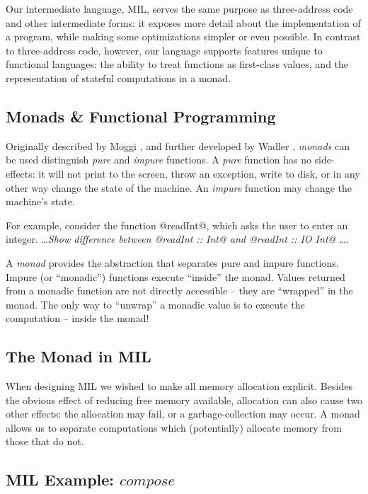 \documentclass[12pt]{report}
\begin{document}
Our intermediate language, MIL, serves the same purpose as
three-address code and other intermediate forms: it exposes more
detail about the implementation of a program, while making some
optimizations simpler or even possible. In contrast to three-address
code, however, our language supports features unique to functional
languages: the ability to treat functions as first-class values, and
the representation of stateful computations in a monad.

\subsection{Monads \& Functional Programming}
Originally described by Moggi \citep{MoggiXX},
and further developed by Wadler \citep{WaddlerXX}, \emph{monads} can be used
distinguish \emph{pure} and \emph{impure} functions. A \emph{pure}
function has no side-effects: it will not print to the screen, throw an
exception, write to disk, or in any other way change the state of the
machine. An \emph{impure} function may change the machine's state. 

For example, consider the function @readInt@, which asks the user to
enter an integer. 
\emph{\dots Show difference between @readInt :: Int@ and
  @readInt :: IO Int@ \dots}.

A \emph{monad} provides the abstraction that separates pure and impure
functions. Impure (or ``monadic'') functions execute ``inside'' the
monad. Values returned from a monadic function are not directly
accessible -- they are ``wrapped'' in the monad. The only way
to ``unwrap'' a monadic value is to execute the computation -- inside
the monad! 

\subsection{The Monad in MIL}

When designing MIL we wished to make all memory allocation
explicit. Besides the obvious effect of reducing free memory
available, allocation can also cause two other effects: the allocation
may fail, or a garbage-collection may occur. A monad allows us to
separate computations which (potentially) allocate memory from those
that do not.

\subsection{MIL Example: $compose$}
\end{document}
